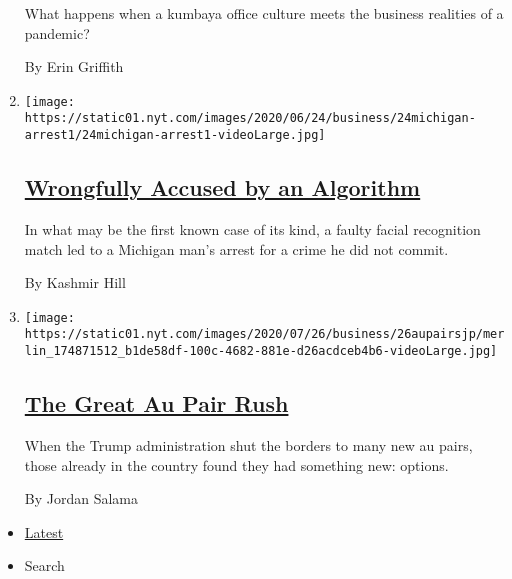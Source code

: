 \begin{enumerate}
  What happens when a kumbaya office culture meets the business
  realities of a pandemic?

  By Erin Griffith
\item
  \texttt{[image: https://static01.nyt.com/images/2020/06/24/business/24michigan-arrest1/24michigan-arrest1-videoLarge.jpg]}

  \hypertarget{wrongfully-accused-by-an-algorithm}{%
  \subsection{\texorpdfstring{\href{/2020/06/24/technology/facial-recognition-arrest.html}{Wrongfully
  Accused by an
  Algorithm}}{Wrongfully Accused by an Algorithm}}\label{wrongfully-accused-by-an-algorithm}}

  In what may be the first known case of its kind, a faulty facial
  recognition match led to a Michigan man's arrest for a crime he did
  not commit.

  By Kashmir Hill
\item
  \texttt{[image: https://static01.nyt.com/images/2020/07/26/business/26aupairsjp/merlin\_174871512\_b1de58df-100c-4682-881e-d26acdceb4b6-videoLarge.jpg]}

  \hypertarget{the-great-au-pair-rush}{%
  \subsection{\texorpdfstring{\href{/2020/07/25/business/the-great-au-pair-rush.html}{The
  Great Au Pair
  Rush}}{The Great Au Pair Rush}}\label{the-great-au-pair-rush}}

  When the Trump administration shut the borders to many new au pairs,
  those already in the country found they had something new: options.

  By Jordan Salama
\end{enumerate}

\begin{itemize}
\tightlist
\item
  \protect\hyperlink{stream-panel}{Latest}
\item
  Search
\end{itemize}

